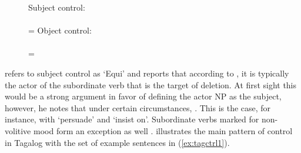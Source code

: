 \begin{figure}[h]
\pex\label{ex:engctrl1}
\a Subject control:\medskip \\
	\\
	= 
\a Object control:\medskip \\
	\\
	= 
\xe
\end{figure}

\citet{kroeger1991} refers to subject control as `Equi' and reports that
according to \citet[505]{schachter1976}, it is typically the actor of the
subordinate verb that is the target of deletion. At first sight this would be a
strong argument in favor of defining the actor NP as the subject, however, he
notes that under certain circumstances, . This is the case, for instance, with  `persuade' and
 `insist on'. Subordinate verbs marked for non-volitive
mood form an exception as well \parencites[36--37]{kroeger1991}[96--97]
{kroeger1991}. \citet{kroeger1991} illustrates the main pattern of control in
Tagalog with the set of example sentences in (\ref{ex:tagctrl1}).

